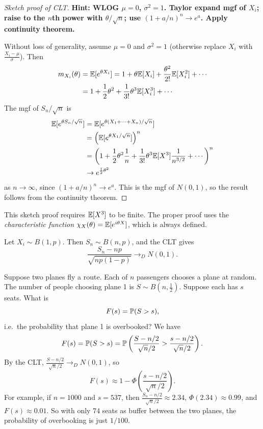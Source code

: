 \documentclass[a4paper]{article}
\begin{document}
\begin{proof}[Sketch proof of CLT]
  \textbf{Hint: WLOG $\mu = 0$, $\sigma^2 = 1$. Taylor expand mgf of $X_i$; raise to the $n$th power with $\theta/\sqrt{n}$; use $(1 + a/n)^n \to e^a$. Apply continuity theorem.}

  Without loss of generality, assume $\mu = 0$ and $\sigma^2 = 1$ (otherwise replace $X_i$ with $\frac{X_i - \mu}{\sigma}$). Then
  \begin{align*}
    m_{X_i}(\theta) &= \E[e^{\theta X_i}] = 1 + \theta \E[X_i] + \frac{\theta^2}{2!} \E[X_i^2] + \dotsb\\
    &= 1 + \frac{1}{2}\theta^2 + \frac{1}{3!}\theta^3 \E[X_i^3] + \dotsb
  \end{align*}
  The mgf of $S_n/\sqrt{n}$ is
  \begin{align*}
    \E[e^{\theta S_n/\sqrt{n}}] &= \E[e^{\theta(X_1 + \dotsb + X_n)/\sqrt{n}}]\\
    &= \left(\E[e^{\theta X_1/\sqrt{n}}]\right)^n\\
    &= \left(1 + \frac{1}{2}\theta^2 \frac{1}{n} + \frac{1}{3!}\theta^3 \E[X^3]\frac{1}{n^{3/2}} + \dotsb\right)^{n}\\
    &\to e^{\frac{1}{2}\theta^2}
  \end{align*}
  as $n \to \infty$, since $(1 + a/n)^n \to e^a$. This is the mgf of $N(0,1)$, so the result follows from the continuity theorem.
\end{proof}

\begin{remark}
  This sketch proof requires $\E[X^3]$ to be finite. The proper proof uses the \emph{characteristic function} $\chi_X(\theta) = \E[e^{i\theta X}]$, which is always defined.
\end{remark}

\begin{eg}
  Let $X_i \sim B(1, p)$. Then $S_n \sim B(n, p)$, and the CLT gives
  \[
    \frac{S_n - np}{\sqrt{np(1 - p)}} \to_D N(0, 1).
  \]
\end{eg}

\begin{eg}
  Suppose two planes fly a route. Each of $n$ passengers chooses a plane at random. The number of people choosing plane 1 is $S\sim B(n, \frac{1}{2})$. Suppose each has $s$ seats. What is
  \[
    F(s) = \P(S > s),
  \]
  i.e.\ the probability that plane 1 is overbooked? We have
  \[
    F(s) = \P(S > s) = \P\left(\frac{S - n/2}{\sqrt{n}/2} > \frac{s - n/2}{\sqrt{n}/2}\right).
  \]
  By the CLT, $\frac{S - n/2}{\sqrt{n}/2} \to_D N(0, 1)$, so
  \[
    F(s) \approx 1 - \Phi\left(\frac{s - n/2}{\sqrt{n}/2}\right).
  \]
  For example, if $n = 1000$ and $s = 537$, then $\frac{S_n - n/2}{\sqrt{n}/2}\approx 2.34$, $\Phi(2.34)\approx 0.99$, and $F(s) \approx 0.01$. So with only $74$ seats as buffer between the two planes, the probability of overbooking is just $1/100$.
\end{eg}
\end{document}
